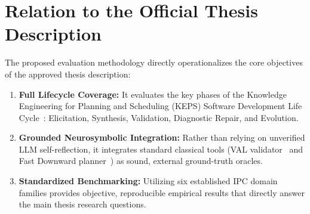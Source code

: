 \documentclass[10pt,a4paper]{article}
\begin{document}
\section{Relation to the Official Thesis Description}
The proposed evaluation methodology directly operationalizes the core objectives of the approved thesis description:
\begin{enumerate}[leftmargin=1.4em]
    \item \textbf{Full Lifecycle Coverage:} It evaluates the key phases of the Knowledge Engineering for Planning and Scheduling (KEPS) Software Development Life Cycle~\cite{georgievski2023sdlc}: Elicitation, Synthesis, Validation, Diagnostic Repair, and Evolution.
    \item \textbf{Grounded Neurosymbolic Integration:} Rather than relying on unverified LLM self-reflection, it integrates standard classical tools (VAL validator~\cite{howey2004val} and Fast Downward planner~\cite{helmert2006fast}) as sound, external ground-truth oracles.
    \item \textbf{Standardized Benchmarking:} Utilizing six established IPC domain families provides objective, reproducible empirical results that directly answer the main thesis research questions.
\end{enumerate}
\end{document}
